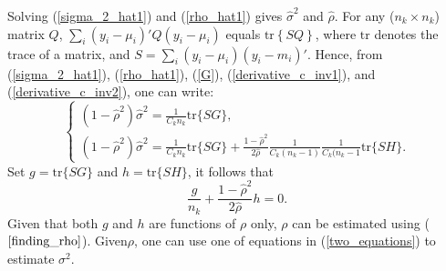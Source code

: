 \documentclass[11pt,a5paper,twoside]{book}
\begin{document}
{Solving (\ref{sigma_2_hat1}) and (\ref{rho_hat1}) gives $\widehat{\sigma}^2$ and $\widehat{\rho}$. For any ($n_k\times n_k$) matrix $Q$,  $\sum_i (y_i- \mu_i)' Q (y_i-\mu_i)$ 
equals $\mathrm{tr}\left\{ S Q \right\}$,
where $\mathrm{tr}$ denotes the trace of a matrix, and $S=\sum_i (y_i-\mu_i)(y_i-m_i)'$. 
Hence, from (\ref{sigma_2_hat1}), (\ref{rho_hat1}), (\ref{G}), (\ref{derivative_c_inv1}), and (\ref{derivative_c_inv2}), one can write:
\begin{equation}
\label{two_equations}
\begin{cases}
(1-\widehat{\rho}^2) \widehat{\sigma}^2 = \frac{1}{C_k n_k} \mathrm{tr}\{ SG\},\\
(1-\widehat{\rho}^2)\widehat{\sigma}^2 = \frac{1}{C_k n_k}\mathrm{tr}\{SG\} + \frac{1-\widehat{\rho}^2}{2\widehat{\rho}}\frac{1}{C_k(n_k-1)} \frac{1}{C_k(n_k-1} \mathrm{tr}\{SH\}.
\end{cases}
\end{equation}
Set $g=\mathrm{tr}\{SG\}$ and $h=\mathrm{tr}\{SH\}$, it follows that
\begin{equation}
\label{finding_rho}
\frac{g}{n_k} + \frac{1-\widehat{\rho}^2}{2\widehat{\rho}}h =0.
\end{equation}
Given that both $g$ and $h$ are functions of $\rho$ only, $\rho$ can be estimated using ($\ref{finding_rho}$). Given$\rho$, one can use one of equations in (\ref{two_equations}) to estimate $\sigma^2$.

}
\end{document}
